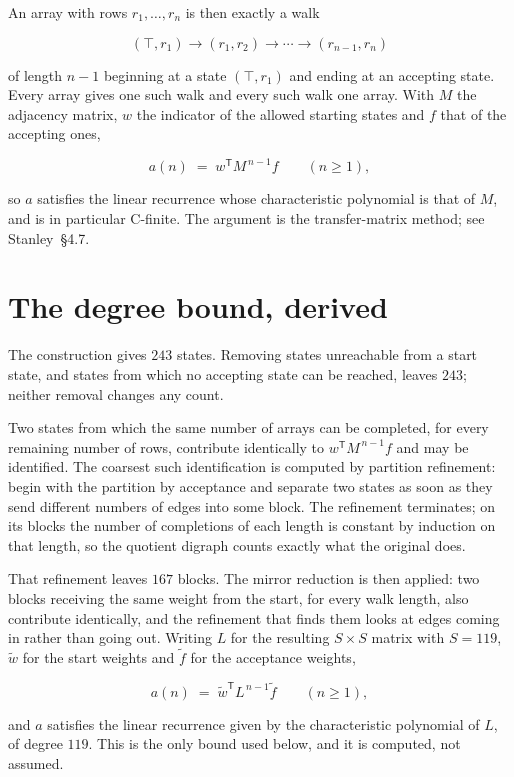 \documentclass[11pt]{article}
\theoremstyle{definition}
\begin{document}
An array with rows $r_1,\dots,r_n$ is then exactly a walk

\[(\top,r_1) \to (r_1,r_2) \to \cdots \to (r_{n-1},r_n)\]

of length $n-1$ beginning at a state $(\top,r_1)$ and ending at an accepting state. Every array gives one such walk and every such walk one array. With $M$ the adjacency matrix, $w$ the indicator of the allowed starting states and $f$ that of the accepting ones,

\[a(n) \;=\; w^{\mathsf T} M^{\,n-1} f \qquad (n \ge 1),\]

so $a$ satisfies the linear recurrence whose characteristic polynomial is that of $M$, and is in particular C-finite. The argument is the transfer-matrix method; see Stanley~\S4.7.

\section{The degree bound, derived}

The construction gives $243$ states. Removing states unreachable from a start state, and states from which no accepting state can be reached, leaves $243$; neither removal changes any count.

Two states from which the same number of arrays can be completed, for every remaining number of rows, contribute identically to $w^{\mathsf T}M^{\,n-1}f$ and may be identified. The coarsest such identification is computed by partition refinement: begin with the partition by acceptance and separate two states as soon as they send different numbers of edges into some block. The refinement terminates; on its blocks the number of completions of each length is constant by induction on that length, so the quotient digraph counts exactly what the original does.

That refinement leaves $167$ blocks. The mirror reduction is then applied: two blocks receiving the same weight from the start, for every walk length, also contribute identically, and the refinement that finds them looks at edges coming in rather than going out. Writing $L$ for the resulting $S \times S$ matrix with $S = 119$, $\tilde w$ for the start weights and $\tilde f$ for the acceptance weights,

\[a(n) \;=\; \tilde w^{\mathsf T} L^{\,n-1} \tilde f \qquad (n \ge 1),\]

and $a$ satisfies the linear recurrence given by the characteristic polynomial of $L$, of degree $119$. This is the only bound used below, and it is computed, not assumed.
\end{document}
